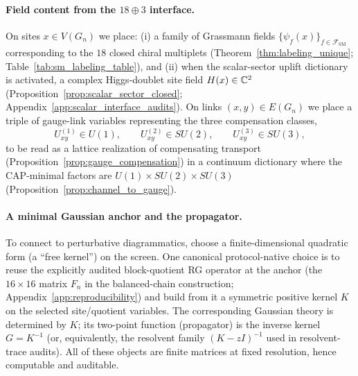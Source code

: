 \paragraph{Field content from the \texorpdfstring{$18\oplus 3$}{18+3} interface.}
On sites $x\in V(G_n)$ we place:
(i) a family of Grassmann fields $\{\psi_f(x)\}_{f\in\mathcal{F}_{\mathrm{SM}}}$ corresponding to the $18$ closed chiral multiplets (Theorem~\ref{thm:labeling_unique}; Table~\ref{tab:sm_labeling_table}),
and (ii) when the scalar-sector uplift dictionary is activated, a complex Higgs-doublet site field $H(x)\in\mathbb{C}^2$ (Proposition~\ref{prop:scalar_sector_closed}; Appendix~\ref{app:scalar_interface_audits}).
On links $(x,y)\in E(G_n)$ we place a triple of gauge-link variables representing the three compensation classes,
\[
U_{xy}^{(1)}\in U(1),\qquad U_{xy}^{(2)}\in SU(2),\qquad U_{xy}^{(3)}\in SU(3),
\]
to be read as a lattice realization of compensating transport (Proposition~\ref{prop:gauge_compensation}) in a continuum dictionary where the CAP-minimal factors are $U(1)\times SU(2)\times SU(3)$ (Proposition~\ref{prop:channel_to_gauge}).

\paragraph{A minimal Gaussian anchor and the propagator.}
To connect to perturbative diagrammatics, choose a finite-dimensional quadratic form (a ``free kernel'') on the screen.
One canonical protocol-native choice is to reuse the explicitly audited block-quotient RG operator at the anchor (the $16\times 16$ matrix $F_n$ in the balanced-chain construction; Appendix~\ref{app:reproducibility}) and build from it a symmetric positive kernel $K$ on the selected site/quotient variables.
The corresponding Gaussian theory is determined by $K$; its two-point function (propagator) is the inverse kernel $G=K^{-1}$ (or, equivalently, the resolvent family $(K-zI)^{-1}$ used in resolvent-trace audits).
All of these objects are finite matrices at fixed resolution, hence computable and auditable.

